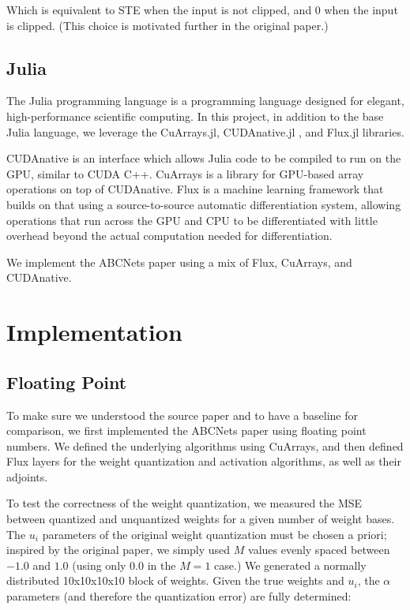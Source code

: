 \documentclass[12pt]{article}
\begin{document}
Which is equivalent to STE when the input is not clipped, and 0 when the input is clipped. (This choice is motivated further in the original paper.)

\subsection{Julia}
\label{sec:org7d203ab}
The Julia programming language \citep{julialang} is a programming language designed for elegant, high-performance scientific computing.
In this project, in addition to the base Julia language, we leverage the CuArrays.jl, CUDAnative.jl \citep{CUDAnativeJL}, and Flux.jl \citep{FluxJL} libraries.

CUDAnative is an interface which allows Julia code to be compiled to run on the GPU, similar to CUDA C++. CuArrays is a library for GPU-based array operations on top of CUDAnative. Flux is a machine learning framework that builds on that using a source-to-source automatic differentiation system, allowing operations that run across the GPU and CPU to be differentiated with little overhead beyond the actual computation needed for differentiation.

We implement the ABCNets paper using a mix of Flux, CuArrays, and CUDAnative.

\section{Implementation}
\label{sec:orgd957aac}
\subsection{Floating Point}
\label{sec:org680b5df}
To make sure we understood the source paper and to have a baseline for comparison, we first implemented the ABCNets paper using floating
point numbers. We defined the underlying algorithms using CuArrays, and then defined Flux layers for the weight quantization and
activation algorithms, as well as their adjoints.

To test the correctness of the weight quantization, we measured the MSE between quantized
and unquantized weights for a given number of weight bases.
The \(u_i\) parameters of the original weight quantization must be chosen a priori; inspired by the original paper, we simply used \(M\) values evenly spaced between \(-1.0\) and \(1.0\) (using only \(0.0\) in the \(M=1\) case.) We generated a normally distributed 10x10x10x10 block of weights. Given the true weights and \(u_i\), the \(\alpha\) parameters (and therefore the quantization error) are fully determined:
\end{document}
